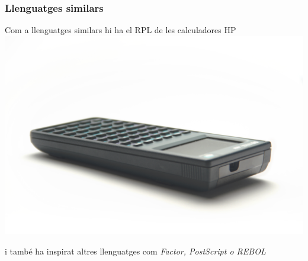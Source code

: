 \documentclass{beamer}
\begin{document}
\begin{frame}
    \frametitle{Llenguatges similars}
    Com a llenguatges similars hi ha el RPL de les calculadores HP
    \includegraphics[width=0.4\linewidth]{hp}
    
    i també ha inspirat altres llenguatges com \emph{Factor, PostScript o REBOL}
\end{frame}
\end{document}
